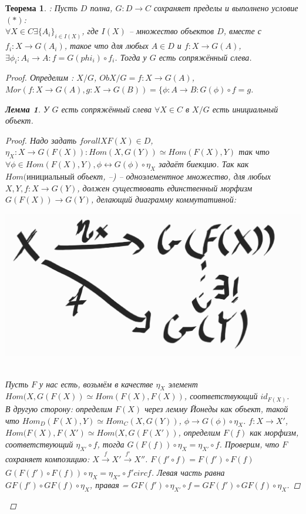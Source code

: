 \documentclass[a4paper]{article}
\theoremstyle{indented}
\newtheorem{theorem}{Теорема}
\newtheorem{lemma}{Лемма}
\theoremstyle{definition}
\theoremstyle{remark}
\begin{document}
\begin{itemize}
\begin{theorem} : Пусть $D$ полна, $G: D \longrightarrow C$ сохраняет пределы и выполнено условие $(*)$:
\\ $\forall X \in C \exists \lbrace A_i \rbrace_{i \in I(X)}$, где $I(X)$ -- множество объектов $D$, вместе с $f_i : X \longrightarrow G(A_i)$, такое что для любых $A \in D$ и $f: X \longrightarrow G(A)$, $\exists \phi_i : A_i \longrightarrow A: f = G(phi_i) \circ f_i$. Тогда у $G$ есть сопряжённый слева. 
\begin{proof}
Определим : $X/G$, $ObX/G = f: X \rightarrow G(A)$, $Mor(f: X \rightarrow G(A), g: X \rightarrow G(B)) = \lbrace \phi: A \rightarrow B: G(\phi) \circ f = g$.
\begin{lemma} У $G$ есть сопряжённый слева \Leftrightarrow $\forall X \in C$ в $X/G$ есть инициальный объект.
\begin{proof} Надо задать $forall X F(X) \in D$, $\eta_X: X \rightarrow G(F(X)): Hom(X, G(Y)) \simeq Hom(F(X), Y)$ так что $\forall \phi \in Hom(F(X), Y), \phi \longleftrightarrow G(\phi)\circ \eta_X$ задаёт биекцию. Так как $Hom(инициальный$ объект, --) -- одноэлементное множество, для любых $X, Y, f: X \rightarrow G(Y)$, должен существовать единственный морфизм $G(F(X)) \rightarrow G(Y)$, делающий диаграмму коммутативной: 
 \begin{center}\includegraphics[scale=0.3]{lemma_for_Freid (1).pdf}\end{center}

\\Пусть $F$ у нас есть, возьмём в качестве $\eta_X$ элемент $Hom(X, G(F(X)) \simeq Hom(F(X), F(X))$, соответствующий $id_{F(X)}$.
\\В другую сторону: определим $F(X)$ через лемму Йонеды как объект, такой что $Hom_D(F(X), Y) \simeq Hom_C(X, G(Y))$, $\phi \rightarrow G(\phi) \circ \eta_X$. $f: X \rightarrow X'$, $Hom(F(X), F(X') \simeq Hom(X, G(F(X'))$, определим $F(f)$ как морфизм, соответствующий $\eta_{X'} \circ f$, тогда $G(F(f)) \circ \eta_X = \eta_{X'} \circ f$. Проверим, что $F$ сохраняет композицию:  $X \xrightarrow[]{f} X' \xrightarrow[]{f'} X''$. $F(f' \circ f) = F(f') \circ F(f)$ \Leftrightarrow $G(F(f') \circ F(f)) \circ \eta_X = \eta_{X''} \circ f' circ f$. Левая часть равна $GF(f') \circ GF(f) \circ \eta_X$, правая = $GF(f') \circ \eta_{X'} \circ f = GF(f') \circ GF(f) \circ \eta_X$.


\end{proof}
\end{lemma}
\end{proof}
\end{theorem}
\end{itemize}
\end{document}
